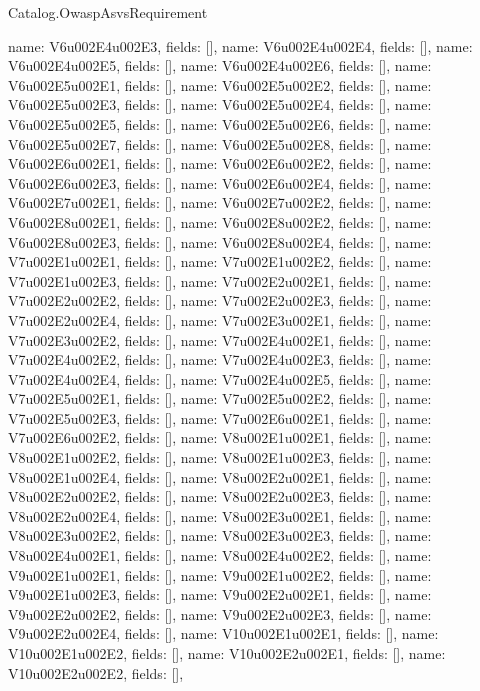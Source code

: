 \begin{lexlean}{Catalog.OwaspAsvsRequirement}
\begin{semanticmodule}
{    {name: V6u002E4u002E3, fields: []},
    {name: V6u002E4u002E4, fields: []},
    {name: V6u002E4u002E5, fields: []},
    {name: V6u002E4u002E6, fields: []},
    {name: V6u002E5u002E1, fields: []},
    {name: V6u002E5u002E2, fields: []},
    {name: V6u002E5u002E3, fields: []},
    {name: V6u002E5u002E4, fields: []},
    {name: V6u002E5u002E5, fields: []},
    {name: V6u002E5u002E6, fields: []},
    {name: V6u002E5u002E7, fields: []},
    {name: V6u002E5u002E8, fields: []},
    {name: V6u002E6u002E1, fields: []},
    {name: V6u002E6u002E2, fields: []},
    {name: V6u002E6u002E3, fields: []},
    {name: V6u002E6u002E4, fields: []},
    {name: V6u002E7u002E1, fields: []},
    {name: V6u002E7u002E2, fields: []},
    {name: V6u002E8u002E1, fields: []},
    {name: V6u002E8u002E2, fields: []},
    {name: V6u002E8u002E3, fields: []},
    {name: V6u002E8u002E4, fields: []},
    {name: V7u002E1u002E1, fields: []},
    {name: V7u002E1u002E2, fields: []},
    {name: V7u002E1u002E3, fields: []},
    {name: V7u002E2u002E1, fields: []},
    {name: V7u002E2u002E2, fields: []},
    {name: V7u002E2u002E3, fields: []},
    {name: V7u002E2u002E4, fields: []},
    {name: V7u002E3u002E1, fields: []},
    {name: V7u002E3u002E2, fields: []},
    {name: V7u002E4u002E1, fields: []},
    {name: V7u002E4u002E2, fields: []},
    {name: V7u002E4u002E3, fields: []},
    {name: V7u002E4u002E4, fields: []},
    {name: V7u002E4u002E5, fields: []},
    {name: V7u002E5u002E1, fields: []},
    {name: V7u002E5u002E2, fields: []},
    {name: V7u002E5u002E3, fields: []},
    {name: V7u002E6u002E1, fields: []},
    {name: V7u002E6u002E2, fields: []},
    {name: V8u002E1u002E1, fields: []},
    {name: V8u002E1u002E2, fields: []},
    {name: V8u002E1u002E3, fields: []},
    {name: V8u002E1u002E4, fields: []},
    {name: V8u002E2u002E1, fields: []},
    {name: V8u002E2u002E2, fields: []},
    {name: V8u002E2u002E3, fields: []},
    {name: V8u002E2u002E4, fields: []},
    {name: V8u002E3u002E1, fields: []},
    {name: V8u002E3u002E2, fields: []},
    {name: V8u002E3u002E3, fields: []},
    {name: V8u002E4u002E1, fields: []},
    {name: V8u002E4u002E2, fields: []},
    {name: V9u002E1u002E1, fields: []},
    {name: V9u002E1u002E2, fields: []},
    {name: V9u002E1u002E3, fields: []},
    {name: V9u002E2u002E1, fields: []},
    {name: V9u002E2u002E2, fields: []},
    {name: V9u002E2u002E3, fields: []},
    {name: V9u002E2u002E4, fields: []},
    {name: V10u002E1u002E1, fields: []},
    {name: V10u002E1u002E2, fields: []},
    {name: V10u002E2u002E1, fields: []},
    {name: V10u002E2u002E2, fields: []},
}
\end{semanticmodule}
\end{lexlean}
